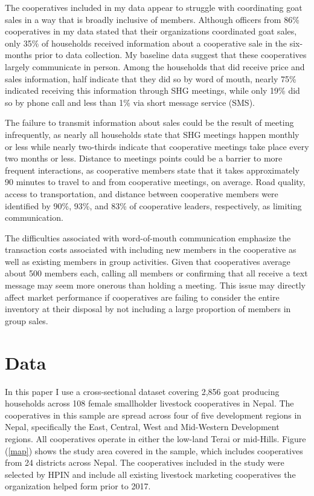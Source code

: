 \documentclass[11pt]{article}
\begin{document}
The cooperatives included in my data appear to struggle with coordinating goat sales in a way that is broadly inclusive of members. Although officers from 86\% cooperatives in my data stated that their organizations coordinated goat sales, only 35\% of households received information about a cooperative sale in the six-months prior to data collection. My baseline data suggest that these cooperatives largely communicate in person. Among the households that did receive price and sales information, half indicate that they did so by word of mouth, nearly 75\% indicated receiving this information through SHG meetings, while only 19\% did so by phone call and less than 1\% via short message service (SMS).

The failure to transmit information about sales could be the result of meeting infrequently, as nearly all households state that SHG meetings happen monthly or less while nearly two-thirds indicate that cooperative meetings take place every two months or less. Distance to meetings points could be a barrier to more frequent interactions, as cooperative members state that it takes approximately 90 minutes to travel to and from cooperative meetings, on average. Road quality, access to transportation, and distance between cooperative members were identified by 90\%, 93\%, and 83\% of cooperative leaders, respectively, as limiting communication.

The difficulties associated with word-of-mouth communication emphasize the transaction costs associated with including new members in the cooperative as well as existing members in group activities. Given that cooperatives average about 500 members each, calling all members or confirming that all receive a text message may seem more onerous than holding a meeting. This issue may directly affect market performance if cooperatives are failing to consider the entire inventory at their disposal by not including a large proportion of members in group sales. 

\section{Data} \label{sec:data}
In this paper I use a cross-sectional dataset covering 2,856 goat producing households across 108 female smallholder livestock cooperatives in Nepal. The cooperatives in this sample are spread across four of five development regions in Nepal, specifically the East, Central, West and Mid-Western Development regions. All cooperatives operate in either the low-land Terai or mid-Hills. Figure (\ref{map}) shows the study area covered in the sample, which includes cooperatives from 24 districts across Nepal. The cooperatives included in the study were selected by HPIN and include all existing livestock marketing cooperatives the organization helped form prior to 2017.
\end{document}
